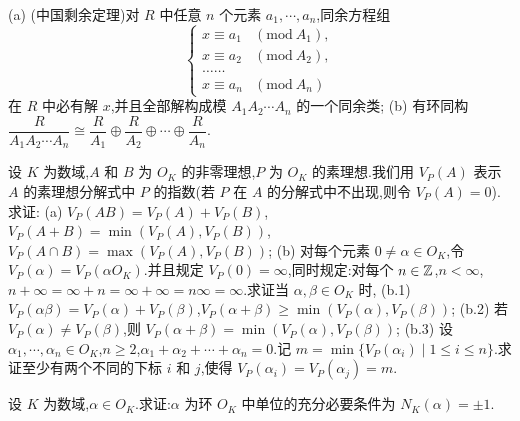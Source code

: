 \begin{Exercises}
        (a) (中国剩余定理)对 $R$ 中任意 $n$ 个元素 $a_1,\cdots,a_n$,同余方程组
        \[
          \begin{cases}
            x\equiv a_1 & (\mathrm{mod}\ A_1),\\
            x\equiv a_2 & (\mathrm{mod}\ A_2),\\
            \dots\dots\\
            x\equiv a_n & (\mathrm{mod}\ A_n)
          \end{cases}
        \]
        在 $R$ 中必有解 $x$,并且全部解构成模 $A_1A_2\cdots A_n$ 的一个同余类;
        (b) 有环同构 $\dfrac{R}{A_1A_2\cdots A_n}\cong\dfrac{R}{A_1}\oplus\dfrac{R}{A_2}\oplus\cdots\oplus\dfrac{R}{A_n}$.
  \item 设 $K$ 为数域,$A$ 和 $B$ 为 $O_K$ 的非零理想,$P$ 为 $O_K$ 的素理想.我们用 $V_P(A)$ 表示 $A$ 的素理想分解式中 $P$ 的指数(若 $P$ 在 $A$ 的分解式中不出现,则令 $V_P(A)=0$).求证:
        (a) $V_P(AB)=V_P(A)+V_P(B)$,$V_P(A+B)=\min(V_P(A),V_P(B))$,$V_P(A\cap B)=\max(V_P(A),V_P(B))$;
        (b) 对每个元素 $0\neq\alpha\in O_K$,令 $V_P(\alpha)=V_P(\alpha O_K)$.并且规定 $V_P(0)=\infty$,同时规定:对每个 $n\in\mathbb{Z}$,$n<\infty$,$n+\infty=\infty+n=\infty+\infty=n\infty=\infty$.求证当 $\alpha,\beta\in O_K$ 时,
        (b.1) $V_P(\alpha\beta)=V_P(\alpha)+V_P(\beta)$,$V_P(\alpha+\beta)\geqslant\min(V_P(\alpha),V_P(\beta))$;
        (b.2) 若 $V_P(\alpha)\neq V_P(\beta)$,则 $V_P(\alpha+\beta)=\min(V_P(\alpha),V_P(\beta))$;
        (b.3) 设 $\alpha_1,\cdots,\alpha_n\in O_K$,$n\geqslant 2$,$\alpha_1+\alpha_2+\cdots+\alpha_n=0$.记 $m=\min\{V_P(\alpha_i)\mid 1\leqslant i\leqslant n\}$.求证至少有两个不同的下标 $i$ 和 $j$,使得 $V_P(\alpha_i)=V_P(\alpha_j)=m$.
  \item 设 $K$ 为数域,$\alpha\in O_K$.求证:$\alpha$ 为环 $O_K$ 中单位的充分必要条件为 $N_K(\alpha)=\pm 1$.
\end{Exercises}
